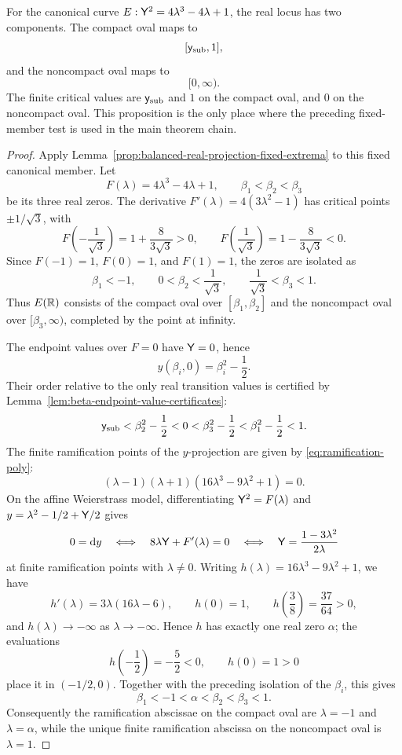 \begin{proposition}\label{cor:quartic-real-projection-framework}\label{cor:two-interval-specialization}
For the canonical curve $E:\mathsf{Y}^2=4\lambda^3-4\lambda+1$, the real locus has two components.  The compact oval maps to
\[
[\mathsf{y}_{\mathrm{sub}},1],
\]
and the noncompact oval maps to
\[
[0,\infty).
\]
The finite critical values are $\mathsf{y}_{\mathrm{sub}}$ and $1$ on the compact oval, and $0$ on the noncompact oval.  This proposition is the only place where the preceding fixed-member test is used in the main theorem chain.
\end{proposition}
\begin{proof}
Apply Lemma~\ref{prop:balanced-real-projection-fixed-extrema} to this fixed canonical member.
Let
\[
F(\lambda)=4\lambda^3-4\lambda+1,
\qquad
\beta_1<\beta_2<\beta_3
\]
be its three real zeros.
The derivative $F'(\lambda)=4(3\lambda^2-1)$ has critical points $\pm1/\sqrt3$, with
\[
F\!\left(-\frac1{\sqrt3}\right)=1+\frac{8}{3\sqrt3}>0,
\qquad
F\!\left(\frac1{\sqrt3}\right)=1-\frac{8}{3\sqrt3}<0.
\]
Since $F(-1)=1$, $F(0)=1$, and $F(1)=1$, the zeros are isolated as
\[
\beta_1<-1,
\qquad
0<\beta_2<\frac1{\sqrt3},
\qquad
\frac1{\sqrt3}<\beta_3<1.
\]
Thus $E(\mathbb{R})$ consists of the compact oval over $[\beta_1,\beta_2]$ and the noncompact oval over $[\beta_3,\infty)$, completed by the point at infinity.

The endpoint values over $F=0$ have $\mathsf{Y}=0$, hence
\[
y(\beta_i,0)=\beta_i^2-\frac12.
\]
Their order relative to the only real transition values is certified by Lemma~\ref{lem:beta-endpoint-value-certificates}:
\[
\mathsf{y}_{\mathrm{sub}}<\beta_2^2-\frac12<0<\beta_3^2-\frac12<\beta_1^2-\frac12<1.
\]
The finite ramification points of the $y$-projection are given by \eqref{eq:ramification-poly}:
\[
(\lambda-1)(\lambda+1)(16\lambda^3-9\lambda^2+1)=0.
\]
On the affine Weierstrass model, differentiating
\(\mathsf{Y}^2=F(\lambda)\) and \(y=\lambda^2-1/2+\mathsf{Y}/2\) gives
\[
0=\mathrm{d} y
\quad\Longleftrightarrow\quad
8\lambda\mathsf{Y}+F'(\lambda)=0
\quad\Longleftrightarrow\quad
\mathsf{Y}=\frac{1-3\lambda^2}{2\lambda}
\]
at finite ramification points with \(\lambda\ne0\).
Writing $h(\lambda)=16\lambda^3-9\lambda^2+1$, we have
\[
h'\!(\lambda)=3\lambda(16\lambda-6),
\qquad
h(0)=1,
\qquad
h\!\left(\frac38\right)=\frac{37}{64}>0,
\]
and $h(\lambda)\to-\infty$ as $\lambda\to-\infty$.
Hence $h$ has exactly one real zero $\alpha$; the evaluations
\[
h\!\left(-\frac12\right)=-\frac52<0,
\qquad
h(0)=1>0
\]
place it in $(-1/2,0)$.
Together with the preceding isolation of the $\beta_i$, this gives
\[
\beta_1<-1<\alpha<\beta_2<\beta_3<1.
\]
Consequently the ramification abscissae on the compact oval are $\lambda=-1$ and $\lambda=\alpha$, while the unique finite ramification abscissa on the noncompact oval is $\lambda=1$.


\end{proof}
